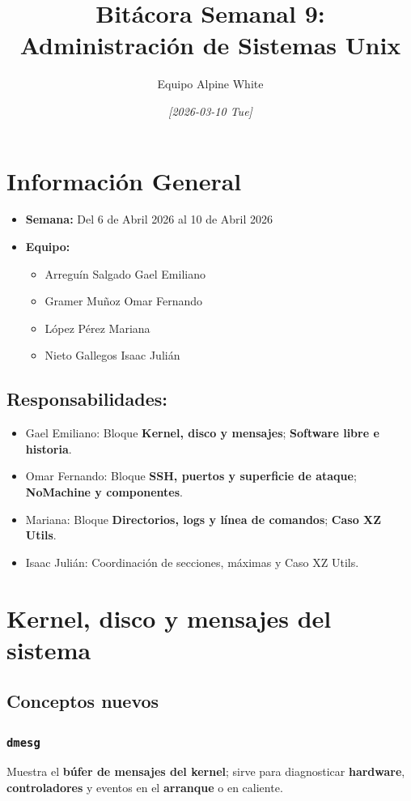 \documentclass[11pt, letterpaper]{article}
\author{Equipo Alpine White}
\date{\textit{{[}2026-03-10 Tue]}}
\title{Bitácora Semanal 9: Administración de Sistemas Unix}
\begin{document}
\maketitle
\setcounter{tocdepth}{2}
\tableofcontents

\section{Información General}
\label{sec:org3568afd}
\begin{itemize}
\item \textbf{Semana:} Del 6 de Abril 2026 al 10 de Abril 2026
\item \textbf{Equipo:}
\begin{itemize}
\item Arreguín Salgado Gael Emiliano
\item Gramer Muñoz Omar Fernando
\item López Pérez Mariana
\item Nieto Gallegos Isaac Julián
\end{itemize}
\end{itemize}
\subsection{Responsabilidades:}
\label{sec:orgec807a5}
\begin{itemize}
\item Gael Emiliano: Bloque \textbf{Kernel, disco y mensajes}; \textbf{Software libre e historia}.
\item Omar Fernando: Bloque \textbf{SSH, puertos y superficie de ataque}; \textbf{NoMachine y componentes}.
\item Mariana: Bloque \textbf{Directorios, logs y línea de comandos}; \textbf{Caso XZ Utils}.
\item Isaac Julián: Coordinación de secciones, máximas y Caso XZ Utils.
\end{itemize}
\section{Kernel, disco y mensajes del sistema}
\label{sec:orge106629}

\subsection{Conceptos nuevos}
\label{sec:org99f8349}

\subsubsection{\texttt{dmesg}}
\label{sec:org9b7f543}
Muestra el \textbf{búfer de mensajes del kernel}; sirve para diagnosticar \textbf{hardware}, \textbf{controladores} y eventos en el \textbf{arranque} o en caliente.
\end{document}
